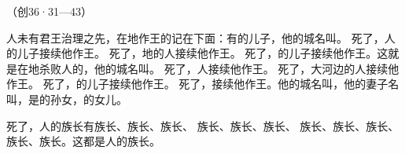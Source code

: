 {\par }{\R （创36·31—43）
\par }{\PP {}人未有君王治理之先，在{}地作王的记在下面：有{}的儿子{}，他的{}城名叫{}。
死了，{}人{}的儿子{}接续他作王。
死了，{}地的人{}接续他作王。
死了，{}的儿子{}接续他作王。这{}就是在{}地杀败{}人的，他的{}城名叫{}。
死了，{}人{}接续他作王。
死了，大河边的{}人{}接续他作王。
死了，{}的儿子{}接续他作王。
死了，{}接续他作王。他的{}城名叫{}，他的妻子名叫{}，是{}的孙女，{}的女儿。
\par }{\PP {}死了，{}人的族长有{}族长、{}族长、{}族长、
族长、{}族长、{}族长、
族长、{}族长、{}族长、
族长、{}族长。这都是{}人的族长。

}
